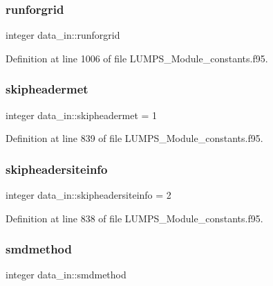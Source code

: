 \subsubsection{\texorpdfstring{runforgrid}{runforgrid}}
{\footnotesize\ttfamily integer data\+\_\+in\+::runforgrid}



Definition at line 1006 of file L\+U\+M\+P\+S\+\_\+\+Module\+\_\+constants.\+f95.

\mbox{\label{namespacedata__in_aea829593453d36d348e367b3238f63ea}} 
\subsubsection{\texorpdfstring{skipheadermet}{skipheadermet}}
{\footnotesize\ttfamily integer data\+\_\+in\+::skipheadermet = 1}



Definition at line 839 of file L\+U\+M\+P\+S\+\_\+\+Module\+\_\+constants.\+f95.

\mbox{\label{namespacedata__in_a964397f0f83d198e4f674a85b7be941a}} 
\subsubsection{\texorpdfstring{skipheadersiteinfo}{skipheadersiteinfo}}
{\footnotesize\ttfamily integer data\+\_\+in\+::skipheadersiteinfo = 2}



Definition at line 838 of file L\+U\+M\+P\+S\+\_\+\+Module\+\_\+constants.\+f95.

\mbox{\label{namespacedata__in_a306f10a44e3e8097152fc6a9c0403f6b}} 
\subsubsection{\texorpdfstring{smdmethod}{smdmethod}}
{\footnotesize\ttfamily integer data\+\_\+in\+::smdmethod}



